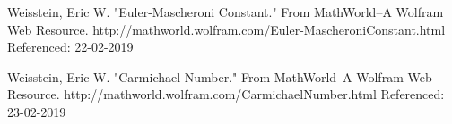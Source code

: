 \documentclass[10pt]{article}
\begin{document}
\begin{thebibliography}{9}
Weisstein, Eric W. "Euler-Mascheroni Constant." From MathWorld--A Wolfram Web Resource. http://mathworld.wolfram.com/Euler-MascheroniConstant.html
Referenced: 22-02-2019

Weisstein, Eric W. "Carmichael Number." From MathWorld--A Wolfram Web Resource. http://mathworld.wolfram.com/CarmichaelNumber.html
Referenced: 23-02-2019

\end{thebibliography}
\end{document}
